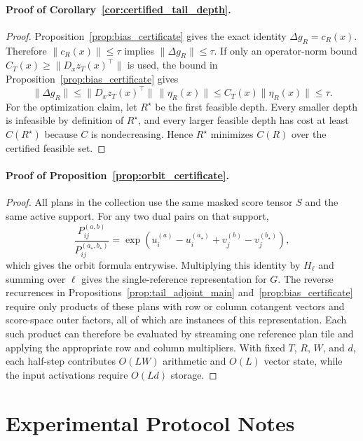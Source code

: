 \documentclass{article}
\begin{document}
\paragraph{Proof of Corollary~\ref{cor:certified_tail_depth}.}
\begin{proof}
Proposition~\ref{prop:bias_certificate} gives the exact identity $\Delta g_R=c_R(x)$. Therefore $\|c_R(x)\|\le\tau$ implies $\|\Delta g_R\|\le\tau$. If only an operator-norm bound $C_T(x)\ge\|D_xz_T(x)^\top\|$ is used, the bound in Proposition~\ref{prop:bias_certificate} gives
\[
\|\Delta g_R\|\le \|D_xz_T(x)^\top\|\,\|\eta_R(x)\|\le C_T(x)\|\eta_R(x)\|\le\tau.
\]
For the optimization claim, let $R^\star$ be the first feasible depth. Every smaller depth is infeasible by definition of $R^\star$, and every larger feasible depth has cost at least $C(R^\star)$ because $C$ is nondecreasing. Hence $R^\star$ minimizes $C(R)$ over the certified feasible set.
\end{proof}

\paragraph{Proof of Proposition~\ref{prop:orbit_certificate}.}
\begin{proof}
All plans in the collection use the same masked score tensor $S$ and the same active support. For any two dual pairs on that support,
\[
\frac{P_{ij}^{(a,b)}}{P_{ij}^{(a_\star,b_\star)}}
=
\exp(u_i^{(a)}-u_i^{(a_\star)}+v_j^{(b)}-v_j^{(b_\star)}),
\]
which gives the orbit formula entrywise. Multiplying this identity by $H_\ell$ and summing over $\ell$ gives the single-reference representation for $G$. The reverse recurrences in Propositions~\ref{prop:tail_adjoint_main} and~\ref{prop:bias_certificate} require only products of these plans with row or column cotangent vectors and score-space outer factors, all of which are instances of this representation. Each such product can therefore be evaluated by streaming one reference plan tile and applying the appropriate row and column multipliers. With fixed $T$, $R$, $W$, and $d$, each half-step contributes $O(LW)$ arithmetic and $O(L)$ vector state, while the input activations require $O(Ld)$ storage.
\end{proof}

\section{Experimental Protocol Notes}
\label{app:protocol}
\end{document}
